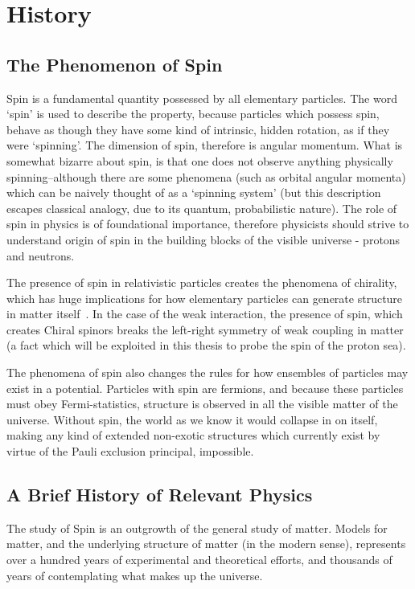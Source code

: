 \chapter{History}
\section{The Phenomenon of Spin}

Spin is a fundamental quantity possessed by all elementary particles. The word
`spin' is used to describe the property, because particles which possess spin,
behave as though they have some kind of intrinsic, hidden rotation, as if they
were `spinning'. The dimension of spin, therefore is angular momentum. What is
somewhat bizarre about spin, is that one does not observe anything physically
spinning--although there are some phenomena (such as orbital angular momenta)
which can be naively thought of as a `spinning system' (but this description
escapes classical analogy, due to its quantum, probabilistic nature). The role
of spin in physics is of foundational importance, therefore physicists should
strive  to understand origin of spin in the building blocks of the visible
universe - protons and neutrons.

The presence of spin in relativistic particles creates the phenomena of
chirality, which has huge implications for how elementary particles can generate
structure in matter itself~\cite{Brodsky1988}. In the case of the weak
interaction, the presence of spin, which creates Chiral spinors breaks the
left-right symmetry of weak coupling in matter (a fact which will be exploited
in this thesis to probe the spin of the proton sea).

The phenomena of spin also changes the rules for how ensembles of particles may
exist in a potential. Particles with spin are fermions, and because these
particles must obey Fermi-statistics, structure is observed in all the visible
matter of the universe. Without spin, the world as we know it would collapse in
on itself, making any kind of extended non-exotic structures which currently
exist by virtue of the Pauli exclusion principal, impossible.

\clearpage
\section{A Brief History of Relevant Physics}

The study of Spin is an outgrowth of the general study of matter.  Models
for matter, and the underlying structure of matter (in the modern sense),
represents over a hundred years of experimental and theoretical efforts, and
thousands of years of contemplating what makes up the universe.

